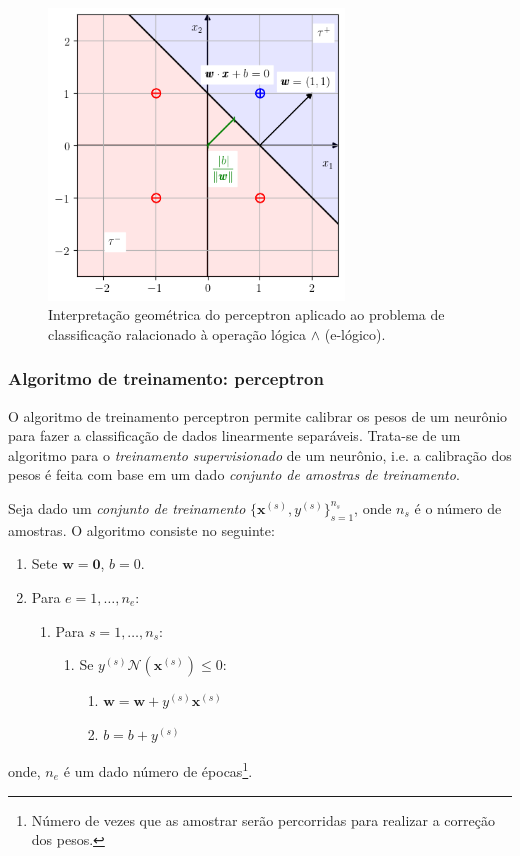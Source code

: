\begin{figure}[H]
  \centering
  \includegraphics[width=0.7\textwidth]{./cap_perceptron/dados/fig_class_e/main}
  \caption{Interpretação geométrica do perceptron aplicado ao problema de classificação ralacionado à operação lógica $\land$ (e-lógico).}
  \label{fig:}
\end{figure}

\subsubsection{Algoritmo de treinamento: perceptron}

O algoritmo de treinamento perceptron permite calibrar os pesos de um neurônio para fazer a classificação de dados linearmente separáveis. Trata-se de um algoritmo para o \emph{treinamento supervisionado} de um neurônio, i.e. a calibração dos pesos é feita com base em um dado \emph{conjunto de amostras de treinamento}.

Seja dado um \emph{conjunto de treinamento} $\{\pmb{x}^{(s)},y^{(s)}\}_{s=1}^{n_s}$, onde $n_s$ é o número de amostras. O algoritmo consiste no seguinte:
\begin{enumerate}
\item Sete $\pmb{w} = \pmb{0}$, $b=0$.
\item Para $e = 1,\dotsc, n_e$:
  \begin{enumerate}
  \item Para $s = 1,\dotsc, n_s$:
    \begin{enumerate}
    \item Se $y^{(s)}\mathcal{N}\left(\pmb{x}^{(s)}\right) \leq 0$:
      \begin{enumerate}
      \item $\pmb{w} = \pmb{w}+y^{(s)}\pmb{x}^{(s)}$
      \item $b = b + y^{(s)}$
      \end{enumerate}
    \end{enumerate}
  \end{enumerate}
\end{enumerate}
onde, $n_e$ é um dado número de épocas\footnote{Número de vezes que as amostrar serão percorridas para realizar a correção dos pesos.}.

